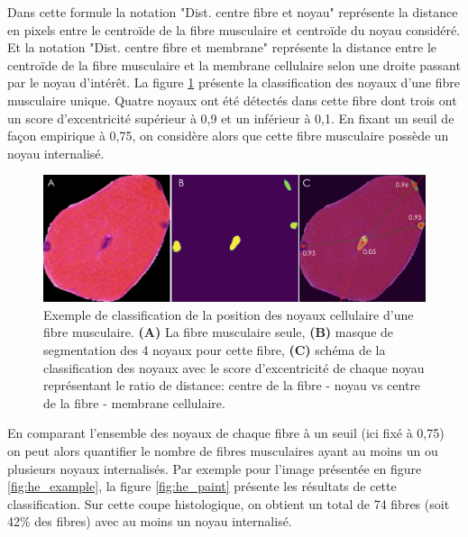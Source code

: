 Dans cette formule la notation "Dist. centre fibre et noyau" représente la distance en pixels entre le centroïde de la fibre musculaire et centroïde du noyau considéré. Et la notation "Dist. centre fibre et membrane" représente la distance entre le centroïde de la fibre musculaire et la membrane cellulaire selon une droite passant par le noyau d'intérêt. La figure \ref{fig:he_single_nuc}  présente la classification des noyaux d'une fibre musculaire unique. Quatre noyaux ont été détectés dans cette fibre dont trois ont un score d'excentricité supérieur à 0,9 et un inférieur à 0,1. En fixant un seuil de façon empirique à 0,75, on considère alors que cette fibre musculaire possède un noyau internalisé.
\begin{figure}[htbp]
 \centering
 \includegraphics[width=1\textwidth]{figures/he_single_nuc.png}
 \caption[Exemple de classification de la position des noyaux]{Exemple de classification de la position des noyaux cellulaire d'une fibre musculaire. \textbf{(A)} La fibre musculaire seule,\textbf{ (B)} masque de segmentation des 4 noyaux pour cette fibre,\textbf{ (C)} schéma de la classification des noyaux avec le score d'excentricité de chaque noyau représentant le ratio de distance: centre de la fibre - noyau vs centre de la fibre - membrane cellulaire.}
 \label{fig:he_single_nuc}
\end{figure}
En comparant l'ensemble des noyaux de chaque fibre à un seuil (ici fixé à 0,75) on peut alors quantifier le nombre de fibres musculaires ayant au moins un ou plusieurs noyaux internalisés. Par exemple pour l'image présentée en figure \ref{fig:he_example}, la figure \ref{fig:he_paint} présente les résultats de cette classification. Sur cette coupe histologique, on obtient un total de 74 fibres (soit 42\% des fibres) avec au moins un noyau internalisé.
